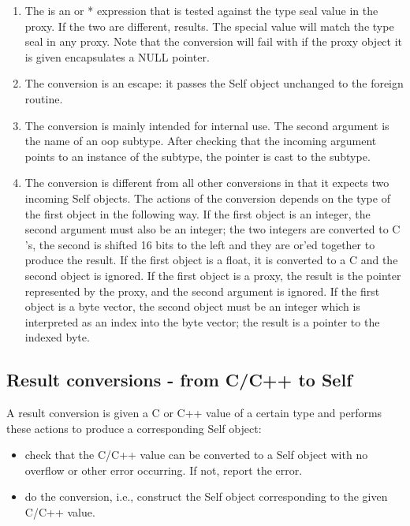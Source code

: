 \documentclass[letterpaper,10pt,english]{sphinxmanual}
\begin{document}
\begin{enumerate}
\item {} 
The  is an  or  * expression that is tested against the type seal value in the
proxy. If the two are different,  results. The special value  will
match the type seal in any proxy. Note that the  conversion will fail with 
if the proxy object it is given encapsulates a NULL pointer.

\item {} 
The  conversion is an escape: it passes the Self object unchanged to the foreign routine.

\item {} 
The  conversion is mainly intended for internal use. The second argument is the name of
an oop subtype. After checking that the incoming argument points to an instance of the subtype,
the pointer is cast to the subtype.

\item {} 
The  conversion is different from all other conversions in that it expects two incoming
Self objects. The actions of the conversion depends on the type of the first object in the following
way. If the first object is an integer, the second argument must also be an integer; the two integers
are converted to C ’s, the second is shifted 16 bits to the left and they are or’ed together to produce
the result. If the first object is a float, it is converted to a C  and the second object is
ignored. If the first object is a proxy, the result is the pointer represented by the proxy, and the second
argument is ignored. If the first object is a byte vector, the second object must be an integer
which is interpreted as an index into the byte vector; the result is a pointer to the indexed byte.

\end{enumerate}


\subsection{Result conversions - from C/C++ to Self}
\label{\detokenize{vmref:index-88}}\label{\detokenize{vmref:result-conversions-from-c-c-to-self}}
A result conversion is given a C or C++ value of a certain type and performs these actions to produce
a corresponding Self object:
\begin{itemize}
\item {} 
check that the C/C++ value can be converted to a Self object with no overflow or other error
occurring. If not, report the error.

\item {} 
do the conversion, i.e., construct the Self object corresponding to the given C/C++ value.

\end{itemize}
\end{document}
